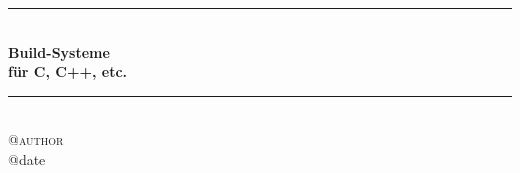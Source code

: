\begin{titlepage}
	\center
	\rule{\textwidth}{1.5pt}\\
	\vspace{1.5em}
	{ 
		\fontsize{30pt}{36pt}\selectfont
		\textbf{Build-Systeme}
	}\\[0.5em]
	{ 
		\fontsize{20pt}{24pt}\selectfont
		\textbf{für C, C++, etc.}
	}
	\vspace{1.5em}
	\rule{\textwidth}{1.5pt}\\
	\vspace{2em}
	{
		\fontsize{16pt}{20pt}\selectfont
		\textsc{\csname @author\endcsname}
		~\\[1em]
		\csname @date\endcsname
	}

\end{titlepage}
